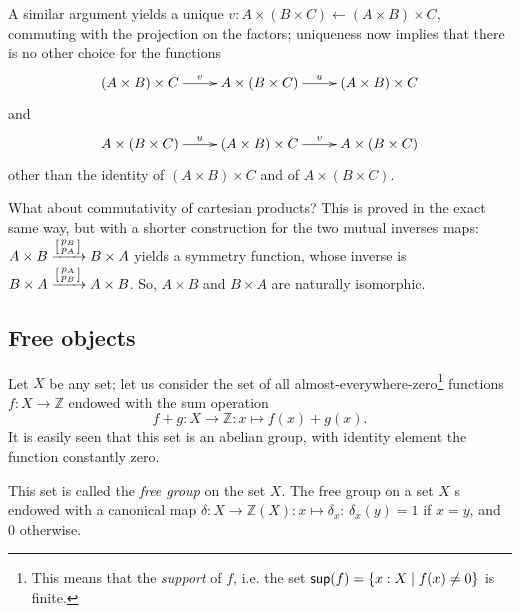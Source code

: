 \documentclass[11pt]{article}
\begin{document}
A similar argument yields a unique \(v : A\times (B\times C) \leftarrow (A\times B)\times C\), commuting with the projection on the factors; uniqueness now implies that there is no other choice for the functions
\[\xymatrix{(A\times B)\times C \ar[r]^v & A\times (B\times C)\ar[r]^u & (A\times B)\times C}\]
and
\[\xymatrix{A\times (B\times C) \ar[r]^u & (A\times B)\times C \ar[r]^v & A\times (B\times C)}\]
other than the identity of $(A\times B)\times C$ and of $A\times (B\times C)$.

What about commutativity of cartesian products? This is proved in the exact same way, but with a shorter construction for the two mutual inverses maps: \(A\times B \xrightarrow{\left[\begin{smallmatrix}p_B\\p_A\end{smallmatrix}\right]} B\times A\) yields a symmetry function, whose inverse is \(B\times A \xrightarrow{\left[\begin{smallmatrix}p_A\\p_B\end{smallmatrix}\right]} A\times B\). So, \(A\times B\) and \(B\times A\) are naturally isomorphic.
\subsection{Free objects}
Let $X$ be any set; let us consider the set of all almost-everywhere-zero\footnote{This means that the \emph{support} of $f$, i.e. the set ${\sf sup}(f)=\{x :  X\mid f(x)\neq 0\}$ is finite.} functions $f : X \to \mathbb Z$ endowed with the sum operation
\[
f+g : X \to \mathbb Z : x \mapsto f(x)+g(x).
\]
It is easily seen that this set is an abelian group, with identity element the function constantly zero.

This set is called the \emph{free group} on the set $X$.
The free group on a set $X$ s endowed with a canonical map $\delta : X \to \mathbb Z(X) : x\mapsto \delta_x$: $\delta_x(y)=1$ if $x=y$, and 0 otherwise.
\end{document}
